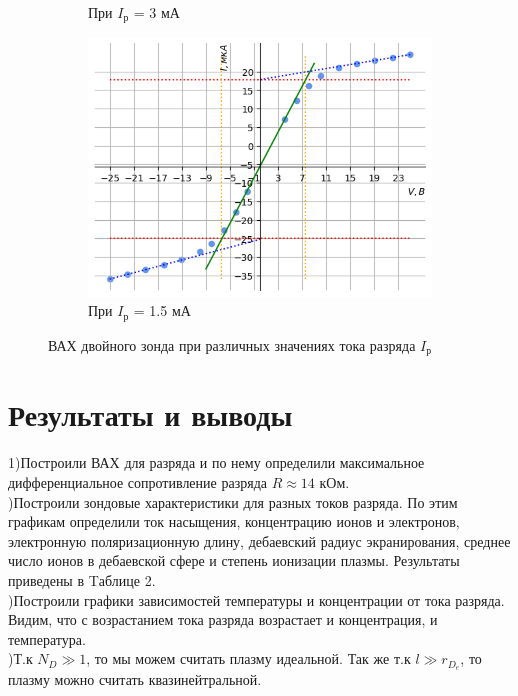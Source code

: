 \begin{figure}[h!]
\begin{subfigure}{0.5\linewidth}
        \caption{При $I_{\text{р}}$ = 3 мА}
    \end{subfigure}
    \hfill
    \begin{subfigure}{0.5\linewidth}
        \centering
        \includegraphics[width=10cm]{images/plotI_1.5.png}
        \caption{При $I_{\text{р}}$ = 1.5 мА}
    \end{subfigure}
    \caption{ВАХ двойного зонда при различных значениях тока разряда $I_{\text{р}}$}
\end{figure}

\section*{Результаты и выводы}
1)Построили ВАХ для разряда и по нему определили максимальное дифференциальное сопротивление разряда $R \approx 14$ кОм.\\ )Построили зондовые характеристики для разных токов разряда. По этим графикам определили ток насыщения, концентрацию ионов и электронов, электронную поляризационную длину, дебаевский радиус экранирования, среднее число ионов в дебаевской сфере и степень ионизации плазмы. Результаты приведены в Tаблице 2.\\ )Построили графики зависимостей температуры и концентрации от тока разряда. Видим, что с возрастанием тока разряда возрастает и концентрация, и температура.\\ )Т.к $N_D \gg 1$, то мы можем считать плазму идеальной. Так же т.к $l\gg r_{D_e} $, то плазму можно считать квазинейтральной.




